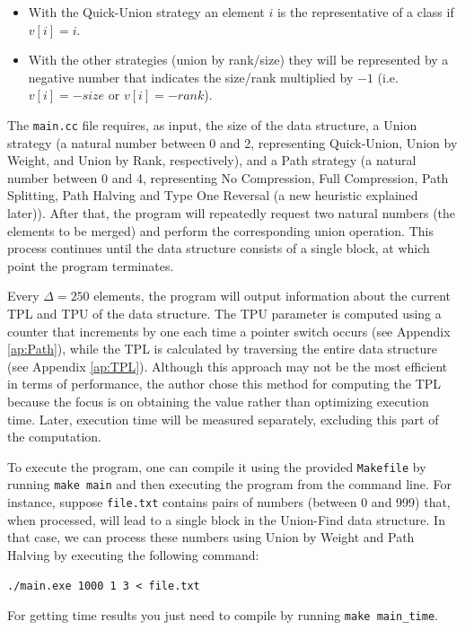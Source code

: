 \begin{itemize}
    \item With the Quick-Union strategy an element $i$ is the representative of a class if $v[i] = i$.
    \item With the other strategies (union by rank/size) they will be represented by a negative number that indicates the size/rank multiplied by $-1$ (i.e. $v[i] = -size$ or $v[i] = -rank$).
\end{itemize}

The \texttt{main.cc} file requires, as input, the size of the data structure, a Union strategy (a natural number between 0 and 2, representing Quick-Union, Union by Weight, and Union by Rank, respectively), and a Path strategy (a natural number between 0 and 4, representing No Compression, Full Compression, Path Splitting, Path Halving and Type One Reversal (a new heuristic explained later)). After that, the program will repeatedly request two natural numbers (the elements to be merged) and perform the corresponding union operation. This process continues until the data structure consists of a single block, at which point the program terminates.

Every $\Delta = 250$ elements, the program will output information about the current TPL and TPU of the data structure. The TPU parameter is computed using a counter that increments by one each time a pointer switch occurs (see Appendix \ref{ap:Path}), while the TPL is calculated by traversing the entire data structure (see Appendix \ref{ap:TPL}). Although this approach may not be the most efficient in terms of performance, the author chose this method for computing the TPL because the focus is on obtaining the value rather than optimizing execution time. Later, execution time will be measured separately, excluding this part of the computation.

To execute the program, one can compile it using the provided \texttt{Makefile} by running \texttt{make main} and then executing the program from the command line. For instance, suppose \texttt{file.txt} contains pairs of numbers (between 0 and 999) that, when processed, will lead to a single block in the Union-Find data structure. In that case, we can process these numbers using Union by Weight and Path Halving by executing the following command:

\texttt{./main.exe 1000 1 3 < file.txt}

For getting time results you just need to compile by running \texttt{make main\_time}.

